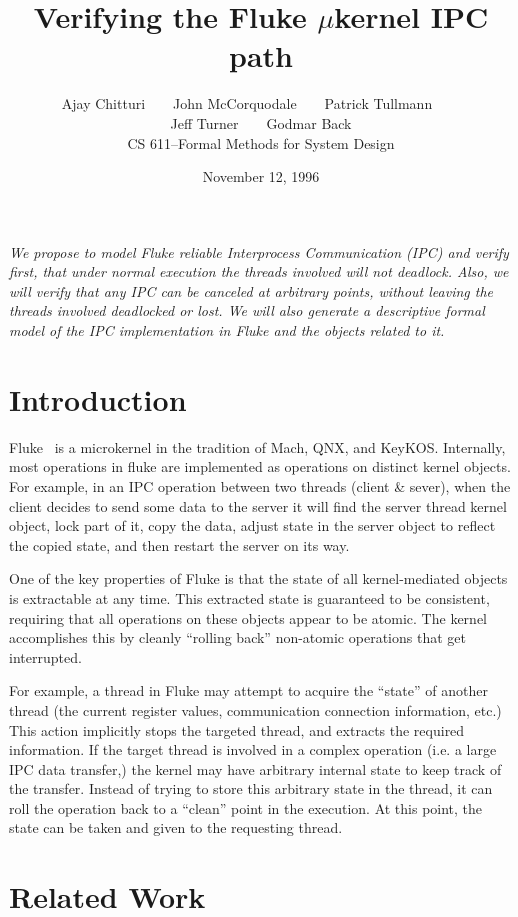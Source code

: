 \documentclass{article}
\title{\Large Verifying the Fluke $\mu$kernel IPC path}
\author{Ajay Chitturi~~~~John McCorquodale~~~~Patrick Tullmann~~~~\\
	Jeff Turner~~~~Godmar Back \\[2ex]
	{\sc CS 611--Formal Methods for System Design}
	}
\date{November 12, 1996}
\begin{document}
\maketitle

{\it We propose to model Fluke reliable Interprocess Communication (IPC)
and verify 
first, that under normal execution the threads involved
will not deadlock.  Also, we will verify
that any IPC can be canceled at arbitrary points, without
leaving the threads involved deadlocked or lost.
We will also generate a descriptive formal model of the IPC
implementation in Fluke and the objects related to it.
}

\section*{Introduction}

Fluke~\cite{Flukedocs:96} is a microkernel in the tradition of Mach, QNX, and KeyKOS.
Internally, most operations in fluke are implemented as operations
on distinct kernel objects.  For example, in an IPC 
operation between two threads (client \& sever), when  
the client decides to send some data to the server it will
find the server thread kernel object, lock part of it, 
copy the data, adjust state in the server object to 
reflect the copied state, and then restart the server
on its way.


One of the key properties of Fluke is that the state of all
kernel-mediated objects is extractable at any time.  This
extracted state is guaranteed to be consistent, requiring
that all operations on these objects appear to be atomic.
The kernel accomplishes this by cleanly ``rolling back''
non-atomic operations that get interrupted.

For example, a thread in Fluke may attempt to acquire the
``state'' of another thread (the current register values,
communication connection information, etc.)  This action
implicitly stops the targeted thread, and extracts the
required information.  
If the target thread is involved in a complex operation
(i.e. a large IPC data transfer,) the kernel may
have arbitrary internal state to keep track of the
transfer.  Instead of trying to store this arbitrary state
in the thread, it can roll the operation back to a ``clean''
point in the execution.  
At this point, the state can be taken and given to the
requesting thread.

\section*{Related Work}
\end{document}
